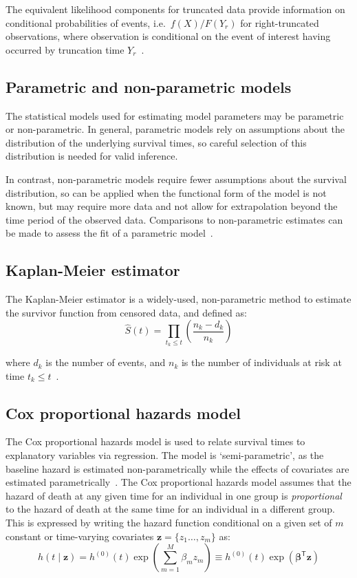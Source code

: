 The equivalent likelihood components for truncated data provide information on conditional probabilities of events, i.e.\ $f(X)/F(Y_r)$ for right-truncated observations, where observation is conditional on the event of interest having occurred by truncation time $Y_r$~\parencite{Klein2005-ls}.

\subsection{Parametric and non-parametric models}

The statistical models used for estimating model parameters may be parametric or non-parametric. In general, parametric models rely on assumptions about the distribution of the underlying survival times, so careful selection of this distribution is needed for valid inference.

In contrast, non-parametric models require fewer assumptions about the survival distribution, so can be applied when the functional form of the model is not known, but may require more data and not allow for extrapolation beyond the time period of the observed data. Comparisons to non-parametric estimates can be made to assess the fit of a parametric model~\parencite{Aalen2008-rf,Jackson2022-lt}.

\subsection{Kaplan-Meier estimator}

The Kaplan-Meier estimator is a widely-used, non-parametric method to estimate the survivor function from censored data, and defined as:
%
\begin{equation}
    \hat{S}(t) = \prod_{t_k \leq t}\left(\frac{n_k - d_k}{n_k}\right)
    \label{eq:kaplan-meier}
\end{equation}

where $d_k$ is the number of events, and $n_k$ is the number of individuals at risk at time $t_k \leq t$~\parencite{Collett2023-bg}.

\subsection{Cox proportional hazards model}\label{sec:cox-model}

The Cox proportional hazards model is used to relate survival times to explanatory variables via regression. The model is `semi-parametric', as the baseline hazard is estimated non-parametrically while the effects of covariates are estimated parametrically~\parencite{Cox1972-ww}. The Cox proportional hazards model assumes that the hazard of death at any given time for an individual in one group is \textit{proportional} to the hazard of death at the same time for an individual in a different group. This is expressed by writing the hazard function conditional on a given set of $m$ constant or time-varying covariates $\bm{z} = \{z_{1}\ldots, z_{m}\}$ as:
%
\[
    h(t \mid \bm{z}) = h^{(0)}(t)\exp\left(\sum_{m=1}^{M}\beta_{m}z_{m}\right) \equiv h^{(0)}(t)\exp(\bm{\beta}^\mathsf{T}\bm{z})
\]

